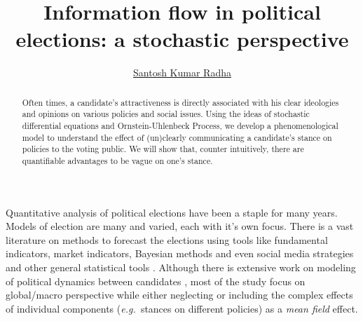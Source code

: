 \documentclass[aps,prl,twocolumn,showpacs,final]{revtex4-1}
\newcommand{\eg}{\textit{e.g.\ }}
\begin{document}
\title{Information flow in political elections: a stochastic perspective}
\author{\href{http://santoshkumarradha.me }{Santosh Kumar Radha}}
\begin{abstract}
	Often times, a candidate's attractiveness is directly associated with his clear ideologies and opinions on various policies and social issues. Using the ideas of stochastic differential equations and Ornstein-Uhlenbeck Process, we develop a phenomenological model to understand the effect of (un)clearly communicating a candidate's stance on policies to the voting public. We will show that, counter intuitively, there are quantifiable advantages to be vague on one's stance. 
\end{abstract}
\maketitle
Quantitative analysis of political elections have been a staple for many years. Models of election are many and varied, each with it’s own focus. There is a vast literature on methods to forecast the elections using tools like fundamental indicators\cite{hummel2013fundamental}, market indicators\cite{berg2008results}, Bayesian methods\cite{linzer2013dynamic} and even social media strategies \cite{gayo2012no} and other general statistical tools \cite{hummel2014fundamental,klarner2008forecasting,lauderdale2015under}. Although there is extensive work on modeling of political dynamics between candidates \cite{bottcher2018clout,braha2017voting,fernandez2014voter,galam2004dynamics,radha2019stochastic}, most of the study focus on global/macro perspective while either neglecting or including the complex effects of individual components (\eg stances on different policies) as a \textit{mean field} effect.
\end{document}
